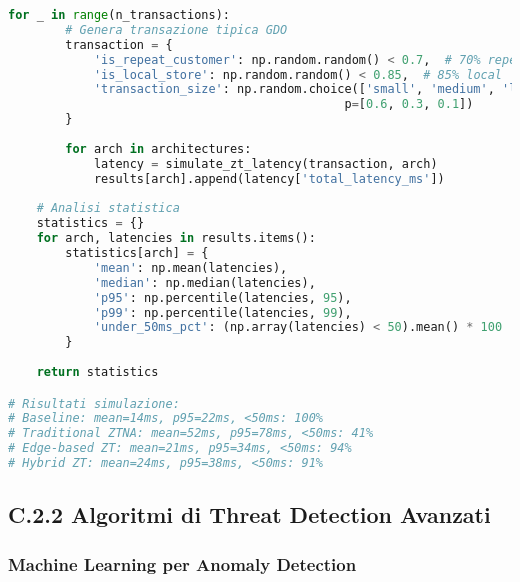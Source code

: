 \begin{lstlisting}[language=Python, caption=Simulazione Latenza con Architetture Zero Trust]
    for _ in range(n_transactions):
        # Genera transazione tipica GDO
        transaction = {
            'is_repeat_customer': np.random.random() < 0.7,  # 70% repeat
            'is_local_store': np.random.random() < 0.85,  # 85% local
            'transaction_size': np.random.choice(['small', 'medium', 'large'],
                                               p=[0.6, 0.3, 0.1])
        }
        
        for arch in architectures:
            latency = simulate_zt_latency(transaction, arch)
            results[arch].append(latency['total_latency_ms'])
    
    # Analisi statistica
    statistics = {}
    for arch, latencies in results.items():
        statistics[arch] = {
            'mean': np.mean(latencies),
            'median': np.median(latencies),
            'p95': np.percentile(latencies, 95),
            'p99': np.percentile(latencies, 99),
            'under_50ms_pct': (np.array(latencies) < 50).mean() * 100
        }
    
    return statistics

# Risultati simulazione:
# Baseline: mean=14ms, p95=22ms, <50ms: 100%
# Traditional ZTNA: mean=52ms, p95=78ms, <50ms: 41%
# Edge-based ZT: mean=21ms, p95=34ms, <50ms: 94%
# Hybrid ZT: mean=24ms, p95=38ms, <50ms: 91%
\end{lstlisting}

\subsection{C.2.2 Algoritmi di Threat Detection Avanzati}

\subsubsection{Machine Learning per Anomaly Detection}

